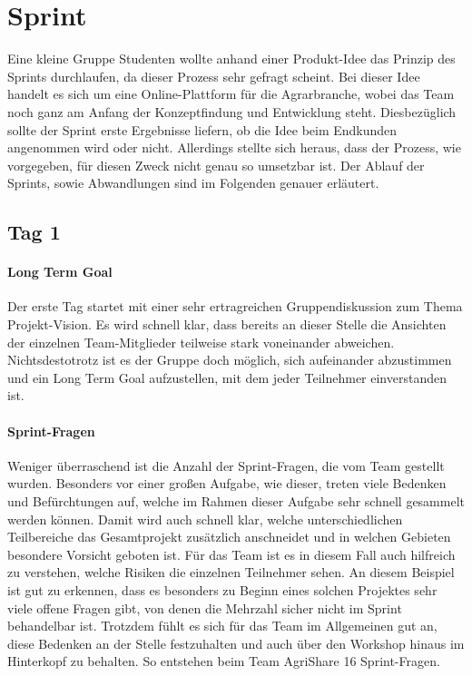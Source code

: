 \section{Sprint}
\label{sec:Sprint-Umsetzung}
Eine kleine Gruppe Studenten wollte anhand einer Produkt-Idee das Prinzip des Sprints durchlaufen, da dieser Prozess sehr gefragt scheint. Bei dieser Idee handelt es sich um eine Online-Plattform für die Agrarbranche, wobei das Team noch ganz am Anfang der Konzeptfindung und Entwicklung steht. Diesbezüglich sollte der Sprint erste Ergebnisse liefern, ob die Idee beim Endkunden angenommen wird oder nicht. Allerdings stellte sich heraus, dass der Prozess, wie vorgegeben, für diesen Zweck nicht genau so umsetzbar ist. Der Ablauf der Sprints, sowie Abwandlungen sind im Folgenden genauer erläutert.
\subsection*{Tag 1}
\paragraph{Long Term Goal}
Der erste Tag startet mit einer sehr ertragreichen Gruppendiskussion zum Thema Projekt-Vision. Es wird schnell klar, dass bereits an dieser Stelle die Ansichten der einzelnen Team-Mitglieder teilweise stark voneinander abweichen. Nichtsdestotrotz ist es der Gruppe doch möglich, sich aufeinander abzustimmen und ein Long Term Goal aufzustellen, mit dem jeder Teilnehmer einverstanden ist.
%
%
\paragraph{Sprint-Fragen}
Weniger überraschend ist die Anzahl der Sprint-Fragen, die vom Team gestellt wurden. Besonders vor einer großen Aufgabe, wie dieser, treten viele Bedenken und Befürchtungen auf, welche im Rahmen dieser Aufgabe sehr schnell gesammelt werden können. Damit wird auch schnell klar, welche unterschiedlichen Teilbereiche das Gesamtprojekt zusätzlich anschneidet und in welchen Gebieten besondere Vorsicht geboten ist. Für das Team ist es in diesem Fall auch hilfreich zu verstehen, welche Risiken die einzelnen Teilnehmer sehen. An diesem Beispiel ist gut zu erkennen, dass es besonders zu Beginn eines solchen Projektes sehr viele offene Fragen gibt, von denen die Mehrzahl sicher nicht im Sprint behandelbar ist. Trotzdem fühlt es sich für das Team im Allgemeinen gut an, diese Bedenken an der Stelle festzuhalten und auch über den Workshop hinaus im Hinterkopf zu behalten. So entstehen beim Team AgriShare 16 Sprint-Fragen.

